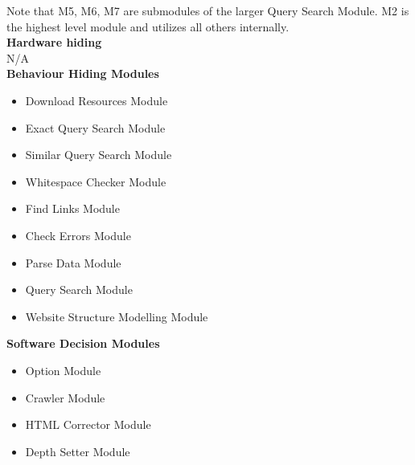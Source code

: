 \documentclass[titlepage]{article}
\begin{document}
Note that M5, M6, M7 are submodules of the larger Query Search Module. M2 is the highest level module and utilizes all others internally.\\

\textbf{Hardware hiding}\\

N/A\\

\textbf{Behaviour Hiding Modules}

\begin{itemize}
\item{Download Resources Module}\\
\item{Exact Query Search Module}\\
\item{Similar Query Search Module}\\
\item{Whitespace Checker Module}\\
\item{Find Links Module}\\
\item{Check Errors Module}\\
\item{Parse Data Module}\\
\item{Query Search Module}\\
\item{Website Structure Modelling Module}\\
\end{itemize}

\textbf{Software Decision Modules}

\begin{itemize}
\item{Option Module}\\
\item{Crawler Module}\\
\item{HTML Corrector Module}\\
\item{Depth Setter Module}\\
\end{itemize}
\end{document}
